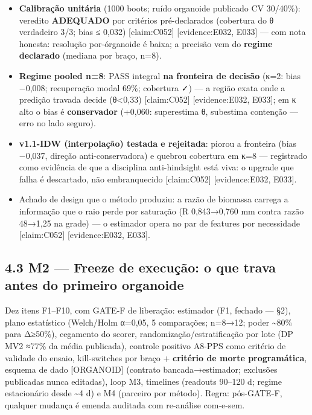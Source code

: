 \documentclass[
  12pt,
]{report}
\providecommand{\tightlist}{%
  \setlength{\itemsep}{0pt}\setlength{\parskip}{0pt}}
\begin{document}
\begin{itemize}
\tightlist
\item
  \textbf{Calibração unitária} (1000 boots; ruído organoide publicado CV
  30/40\%): veredito \textbf{ADEQUADO} por critérios pré-declarados
  (cobertura do θ verdadeiro 3/3; bias ≤ 0,032) {[}claim:C052{]}
  {[}evidence:E032, E033{]} --- com nota honesta: resolução
  por-órganoide é baixa; a precisão vem do \textbf{regime declarado}
  (mediana por braço, n=8).
\item
  \textbf{Regime pooled n=8}: PASS integral \textbf{na fronteira de
  decisão} (κ=2: bias −0,008; recuperação modal 69\%; cobertura ✓) --- a
  região exata onde a predição travada decide (θ\textless0,33)
  {[}claim:C052{]} {[}evidence:E032, E033{]}; em κ alto o bias é
  \textbf{conservador} (+0,060: superestima θ, subestima contenção ---
  erro no lado seguro).
\item
  \textbf{v1.1-IDW (interpolação) testada e rejeitada}: piorou a
  fronteira (bias −0,037, direção anti-conservadora) e quebrou cobertura
  em κ=8 --- registrado como evidência de que a disciplina
  anti-hindsight está viva: o upgrade que falha é descartado, não
  embranquecido {[}claim:C052{]} {[}evidence:E032, E033{]}.
\item
  Achado de design que o método produziu: a razão de biomassa carrega a
  informação que o raio perde por saturação (R 0,843→0,760 mm contra
  razão 48→1,25 na grade) --- o estimador opera no par de features por
  necessidade {[}claim:C052{]} {[}evidence:E032, E033{]}.
\end{itemize}

\hypertarget{m2-freeze-de-execuuxe7uxe3o-o-que-trava-antes-do-primeiro-organoide}{%
\subsection{4.3 M2 --- Freeze de execução: o que trava antes do primeiro
organoide}\label{m2-freeze-de-execuuxe7uxe3o-o-que-trava-antes-do-primeiro-organoide}}

Dez itens F1--F10, com GATE-F de liberação: estimador (F1, fechado ---
§2), plano estatístico (Welch/Holm α=0,05, 5 comparações; n=8→12; poder
\textasciitilde80\% para Δ≥50\%), cegamento do scorer,
randomização/estratificação por lote (DP MV2 ≈77\% da média publicada),
controle positivo A8-PPS como critério de validade do ensaio,
kill-switches por braço + \textbf{critério de morte programática},
esquema de dado {[}ORGANOID{]} (contrato bancada→estimador; exclusões
publicadas nunca editadas), loop M3, timelines (readouts 90--120 d;
regime estacionário desde \textasciitilde4 d) e M4 (parceiro por
método). Regra: pós-GATE-F, qualquer mudança é emenda auditada com
re-análise com-e-sem.
\end{document}
